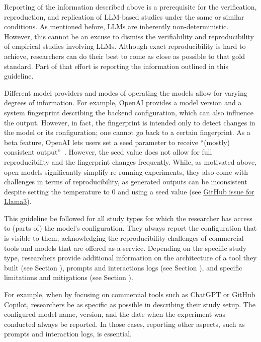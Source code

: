 
Reporting of the information described above is a prerequisite for the verification, reproduction, and replication of LLM-based studies under the same or similar conditions.
As mentioned before, LLMs are inherently non-deterministic. 
However, this cannot be an excuse to dismiss the verifiability and reproducibility of empirical studies involving LLMs.
Although exact reproducibility is hard to achieve, researchers can do their best to come as close as possible to that gold standard.
Part of that effort is reporting the information outlined in this guideline. 


Different model providers and modes of operating the models allow for varying degrees of information.
For example, OpenAI provides a model version and a system fingerprint describing the backend configuration, which can also influence the output.
However, in fact, the fingerprint is intended only to detect changes in the model or its configuration; one cannot go back to a certain fingerprint.
As a beta feature, OpenAI lets users set a seed parameter to receive ``(mostly) consistent output''~\cite{OpenAI23}.
However, the seed value does not allow for full reproducibility and the fingerprint changes frequently. 
While, as motivated above, open models significantly simplify re-running experiments, they also come with challenges in terms of reproducibility, as generated outputs can be inconsistent despite setting the temperature to 0 and using a seed value (see \href{https://github.com/ollama/ollama/issues/5321}{GitHub issue for Llama3}).


This guideline \must be followed for all study types for which the researcher has access to (parts of) the model's configuration.
They \must always report the configuration that is visible to them, acknowledging the reproducibility challenges of commercial tools and models that are offered as-a-service. 
Depending on the specific study type, researchers \should provide additional information on the architecture of a tool they built (see Section \toolarchitecture), prompts and interactions logs (see Section \prompts), and specific limitations and mitigations (see Section \limitationsmitigations).

For example, when \llmusage by focusing on commercial tools such as ChatGPT or GitHub Copilot, researchers \must be as specific as possible in describing their study setup.
The configured model name, version, and the date when the experiment was conducted \must always be reported.
In those cases, reporting other aspects, such as prompts and interaction logs, is essential.
